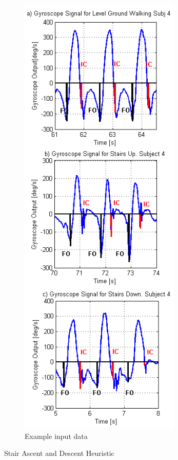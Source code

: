 \begin{figure}[!htb]
\begin{subfigure}[b]{0.28\textwidth}
        \includegraphics[width=\textwidth]{content/2-Background/stair_gyro_signals_2.png}
        \caption{Example input data \cite{Formento2014}}
    \end{subfigure}
    \caption{Stair Ascent and Descent Heuristic}
    \label{fig:bck-stair-heuristic}
\end{figure}


